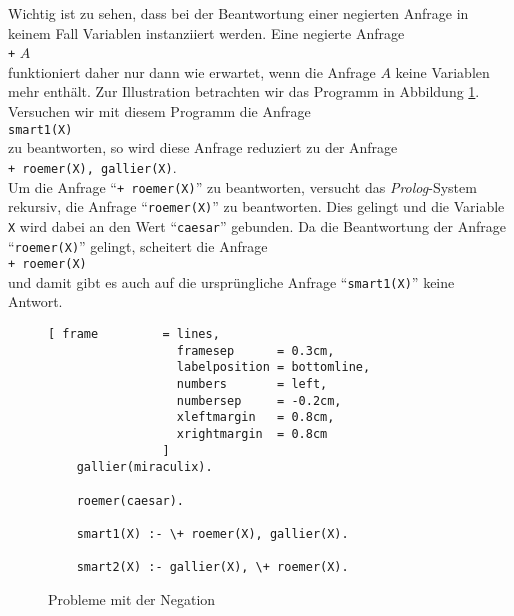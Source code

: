 Wichtig ist zu sehen, dass bei der Beantwortung einer negierten Anfrage in keinem Fall
Variablen instanziiert werden.  Eine negierte Anfrage
\\[0.1cm]
\hspace*{1.3cm} \texttt{+} $A$ \\[0.1cm]
funktioniert daher nur dann wie erwartet, wenn die Anfrage $A$ keine Variablen mehr
enth\"{a}lt.  Zur Illustration betrachten wir das Programm in Abbildung \ref{fig:not-problem}.
Versuchen wir mit diesem Programm die Anfrage \\[0.1cm]
\hspace*{1.3cm} \texttt{smart1(X)} \\[0.1cm]
zu beantworten, so wird diese Anfrage reduziert zu der Anfrage \\[0.1cm]
\hspace*{1.3cm} \texttt{+ roemer(X), gallier(X)}. \\[0.1cm]
Um die Anfrage ``\texttt{+ roemer(X)}'' zu beantworten, 
versucht das \textsl{Prolog}-System rekursiv, die Anfrage ``\texttt{roemer(X)}''
zu beantworten.  Dies gelingt und die Variable \texttt{X} wird dabei an den Wert 
``\texttt{caesar}'' gebunden.  Da die Beantwortung der Anfrage ``\texttt{roemer(X)}''
gelingt, scheitert die Anfrage \\[0.1cm]
\hspace*{1.3cm} \texttt{+ roemer(X)} \\[0.1cm]
und damit gibt es auch auf die urspr\"{u}ngliche Anfrage ``\texttt{smart1(X)}'' keine Antwort.

\begin{figure}[!ht]
  \centering
\begin{Verbatim}[ frame         = lines, 
                  framesep      = 0.3cm, 
                  labelposition = bottomline,
                  numbers       = left,
                  numbersep     = -0.2cm,
                  xleftmargin   = 0.8cm,
                  xrightmargin  = 0.8cm
                ]
    gallier(miraculix).
    
    roemer(caesar).
    
    smart1(X) :- \+ roemer(X), gallier(X).
    
    smart2(X) :- gallier(X), \+ roemer(X).
\end{Verbatim}
\vspace*{-0.3cm}
  \caption{Probleme mit der Negation}
  \label{fig:not-problem}
\end{figure}

